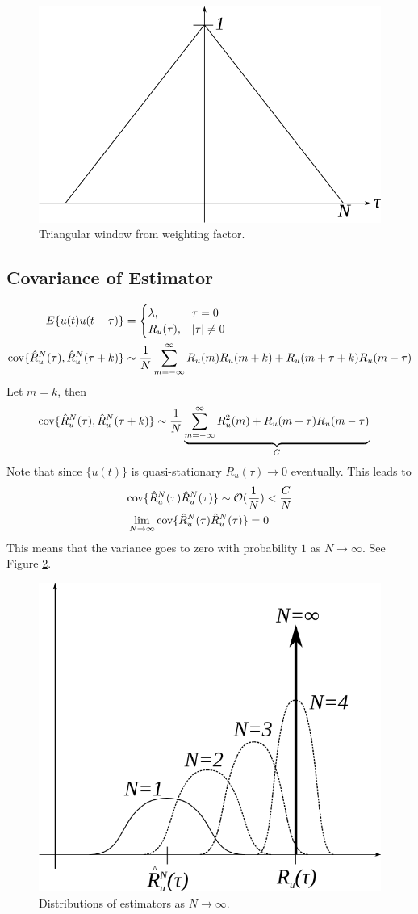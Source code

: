 \begin{figure}[ht!]
	\centering
	\includegraphics[width=.3\textwidth]{images/05triWindow}
	\caption{Triangular window from weighting factor.}
	\label{fig:05triWindow}
\end{figure}

\subsection{Covariance of Estimator}
\begin{align*}
E\{u(t)u(t-\tau)\} &= \begin{cases} \lambda, & \tau=0 \\ R_u(\tau), & |\tau|\neq 0 \end{cases} \\
\text{cov}\{\hat{R}_u^N(\tau),\hat{R}_u^N(\tau+k)\} &\sim \frac{1}{N}\sum_{m=-\infty}^\infty R_u(m)R_u(m+k) + R_u(m+\tau+k)R_u(m-\tau)
\end{align*}
Let $m=k$, then
\begin{align*}
\text{cov}\{\hat{R}_u^N(\tau),\hat{R}_u^N(\tau+k)\} &\sim \frac{1}{N}\underbrace{\sum_{m=-\infty}^\infty R_u^2(m) + R_u(m+\tau)R_u(m-\tau)}_C
\end{align*}
Note that since $\{u(t)\}$ is quasi-stationary $R_u(\tau)\to0$ eventually. This leads to
\begin{align*}
&\text{cov}\{\hat{R}_u^N(\tau)\hat{R}_u^N(\tau)\} \sim \mathcal{O}(\frac{1}{N}) < \frac{C}{N} \\
&\lim_{N\to\infty}\text{cov}\{\hat{R}_u^N(\tau)\hat{R}_u^N(\tau)\} = 0
\end{align*}
This means that the variance goes to zero with probability $1$ as $N\to\infty$. See Figure \ref{fig:05estDist}.
\begin{figure}[ht!]
	\centering
	\includegraphics[width=.4\textwidth]{images/05estDist}
	\caption{Distributions of estimators as $N\to\infty$.}
	\label{fig:05estDist}
\end{figure}

